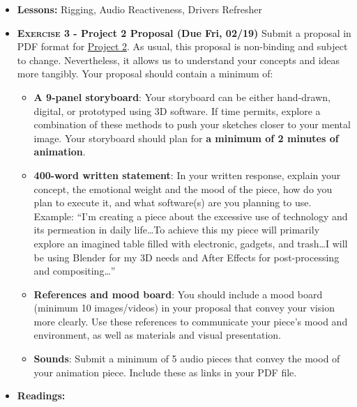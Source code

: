 \def\dMon{Mon, 02/15}
\def\dTues{Tues, 02/16}
\def\dWed{Wed, 02/17}
\def\dThur{Thur, 02/18}
\def\dFri{Fri, 02/19}
\def\dSat{Sat, 02/20}
\def\dSun{Sun, 02/21}
\placeDate



% 
\begin{itemize}[noitemsep,topsep=0pt,leftmargin=*]
    \item \textbf{Lessons:} Rigging, Audio Reactiveness, Drivers Refresher
    \item \textbf{\textsc{Exercise 3} - Project 2 Proposal (Due \dFri)} Submit a proposal in PDF format for \hyperlink{project2}{Project 2}. As usual, this proposal is non-binding and subject to change. Nevertheless, it allows us to understand your concepts and ideas more tangibly. Your proposal should contain a minimum of:
          \begin{itemize}
              \item \textbf{A 9-panel storyboard}: Your storyboard can be either hand-drawn, digital, or prototyped using 3D software. If time permits, explore a combination of these methods to push your sketches closer to your mental image. Your storyboard should plan for \textbf{a minimum of 2 minutes of animation}.
              \item \textbf{400-word written statement}: In your written response, explain your concept, the emotional weight and the mood of the piece, how do you plan to execute it, and what software(s) are you planning to use. \newline
                    Example: ``I'm creating a piece about the excessive use of technology and its permeation in daily life\dots To achieve this my piece will primarily explore an imagined table filled with electronic, gadgets, and trash\dots I will be using Blender for my 3D needs and After Effects for post-processing and compositing\dots''
              \item \textbf{References and mood board}: You should include a mood board (minimum 10 images/videos) in your proposal that convey your vision more clearly. Use these references to communicate your piece's mood and environment, as well as materials and visual presentation.
              \item \textbf{Sounds}: Submit a minimum of 5 audio pieces that convey the mood of your animation piece. Include these as links in your PDF file.
          \end{itemize}
    \item \textbf{Readings:}
          \begin{itemize}

\end{itemize}
\end{itemize}
